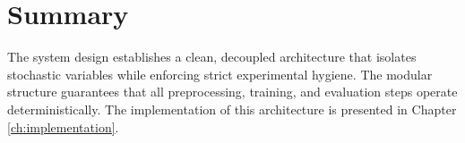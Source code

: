 \section{Summary}
\label{sec:design_summary}

The system design establishes a clean, decoupled architecture that isolates stochastic variables while enforcing strict experimental hygiene. The modular structure guarantees that all preprocessing, training, and evaluation steps operate deterministically. The implementation of this architecture is presented in Chapter \ref{ch:implementation}.

